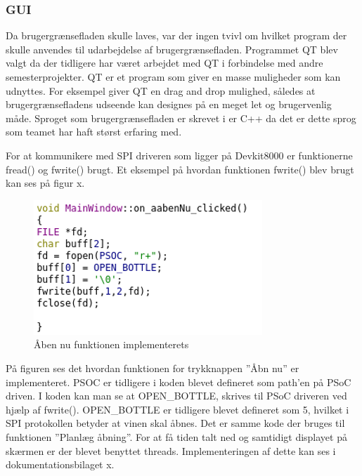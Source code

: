 \subsubsection{GUI}

Da brugergrænsefladen skulle laves, var der ingen tvivl om hvilket program der skulle anvendes til udarbejdelse af brugergrænsefladen. Programmet QT blev valgt da der tidligere har været arbejdet med QT i forbindelse med andre semesterprojekter. QT er et program som giver en masse muligheder som kan udnyttes. For eksempel giver QT en drag and drop mulighed, således at brugergrænsefladens udseende kan designes på en meget let og brugervenlig måde.
Sproget som brugergrænsefladen er skrevet i er C++ da det er dette sprog som teamet har haft størst erfaring med.

For at kommunikere med SPI driveren som ligger på Devkit8000 er funktionerne fread() og fwrite() brugt. Et eksempel på hvordan funktionen fwrite() blev brugt kan ses på figur x.

\begin{figure}[H]
\includegraphics[scale=1]{tex/Implementering/GUI/GUI-implementering/Billeder/kodeeksempel.png}
\caption{Åben nu funktionen implementerets}
\end{figure}

På figuren ses det hvordan funktionen for trykknappen ”Åbn nu” er implementeret. PSOC er tidligere i koden blevet defineret som path’en på PSoC driven. I koden kan man se at OPEN\_BOTTLE, skrives til PSoC driveren ved hjælp af fwrite(). OPEN\_BOTTLE er tidligere blevet defineret som 5, hvilket i SPI protokollen betyder at vinen skal åbnes. Det er samme kode der bruges til funktionen ”Planlæg åbning”.
For at få tiden talt ned og samtidigt displayet på skærmen er der blevet benyttet threads. Implementeringen af dette kan ses i dokumentationsbilaget x.
